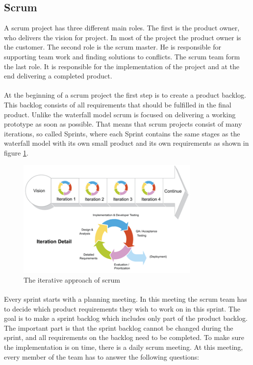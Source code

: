 \subsection{Scrum}
\label{subsec:PrelimMethodScrum}

A scrum project has three different main roles. The first is the product owner, who delivers the vision for project. In most of the project the product owner is the customer. The second role is the scrum master. He is responsible for supporting team work and finding solutions to conflicts. The scrum team form the last role. It is responsible for the implementation of the project and at the end delivering a completed product.

\paragraph{} At the beginning of a scrum project the first step is to create a product backlog. This backlog consists of all requirements that should be fulfilled in the final product. Unlike the waterfall model scrum is focused on delivering a working prototype as soon as possible. That means that scrum projects consist of many iterations, so called Sprints, where each Sprint contains the same stages as the waterfall model with its own small product and its own requirements as shown in figure \ref{fig:PrelimMethodScrumIter}.

\begin{figure}[ht!]
  \centering
  \includegraphics[width=90mm]{./PreliminaryStudies/img/scrum}
  \caption{The iterative approach of scrum}
  \label{fig:PrelimMethodScrumIter}
\end{figure}

\paragraph{} Every sprint starts with a planning meeting. In this meeting the scrum team has to decide which product requirements they wish to work on in this sprint. The goal is to make a sprint backlog which includes only part of the product backlog. The important part is that the sprint backlog cannot be changed during the sprint, and all requirements on the backlog need to be completed. To make sure the implementation is on time, there is a daily scrum meeting. At this meeting, every member of the team has to answer the following questions:

